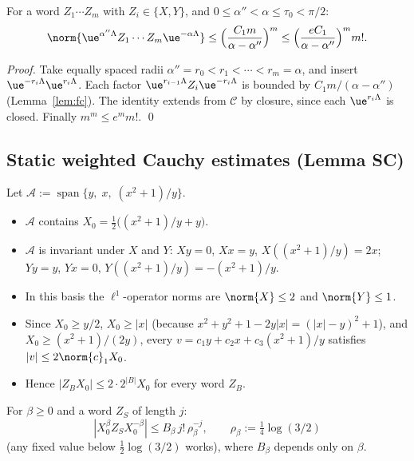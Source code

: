 \begin{lemma}[WC]\label{lem:wc}
For a word $Z_1\cdots Z_m$ with $Z_i\in\{X,Y\}$, and $0\le\alpha''<\alpha\le\tau_0<\pi/2$:
\[
\norm{\ue^{\alpha''\Lambda}Z_1\cdots Z_m\ue^{-\alpha\Lambda}}\le\Bigl(\frac{C_1m}{\alpha-\alpha''}\Bigr)^m\le\Bigl(\frac{eC_1}{\alpha-\alpha''}\Bigr)^m m!.
\]
\end{lemma}

\begin{proof}
Take equally spaced radii $\alpha''=r_0<r_1<\cdots<r_m=\alpha$, and insert $\ue^{-r_i\Lambda}\ue^{r_i\Lambda}$.
Each factor $\ue^{r_{i-1}\Lambda}Z_i\ue^{-r_i\Lambda}$ is bounded by $C_1m/(\alpha-\alpha'')$ (Lemma~\ref{lem:fc}). The identity extends from $\mathcal C$ by closure, since each $\ue^{r_i\Lambda}$ is closed. Finally $m^m\le e^m m!$. \qed
\end{proof}

\subsection{Static weighted Cauchy estimates (Lemma SC)}\label{subsec:dd-sc}

Let $\mathcal A:=\operatorname{span}\{y,\;x,\;(x^2+1)/y\}$.
\begin{itemize}
\item $\mathcal A$ contains $X_0=\tfrac12\bigl((x^2+1)/y+y\bigr)$.
\item $\mathcal A$ is invariant under $X$ and $Y$: $Xy=0$, $Xx=y$, $X((x^2+1)/y)=2x$; $Yy=y$, $Yx=0$, $Y((x^2+1)/y)=-(x^2+1)/y$.
\item In this basis the $\ell^1$-operator norms are $\norm{X}\le2$ and $\norm{Y}\le1$.
\item Since $X_0\ge y/2$, $X_0\ge|x|$ (because $x^2+y^2+1-2y|x|=(|x|-y)^2+1$), and $X_0\ge(x^2+1)/(2y)$, every $v=c_1y+c_2x+c_3(x^2+1)/y$ satisfies $|v|\le2\norm{c}_1X_0$.
\item Hence $|Z_BX_0|\le2\cdot2^{|B|}X_0$ for every word $Z_B$.
\end{itemize}

\begin{lemma}\label{lem:fdb}
For $\beta\ge0$ and a word $Z_S$ of length $j$:
\[
|X_0^\beta Z_SX_0^{-\beta}|\le B_\beta\,j!\,\rho_\beta^{-j},\qquad \rho_\beta:=\tfrac14\log(3/2)
\]
(any fixed value below $\tfrac12\log(3/2)$ works), where $B_\beta$ depends only on $\beta$.
\end{lemma}

